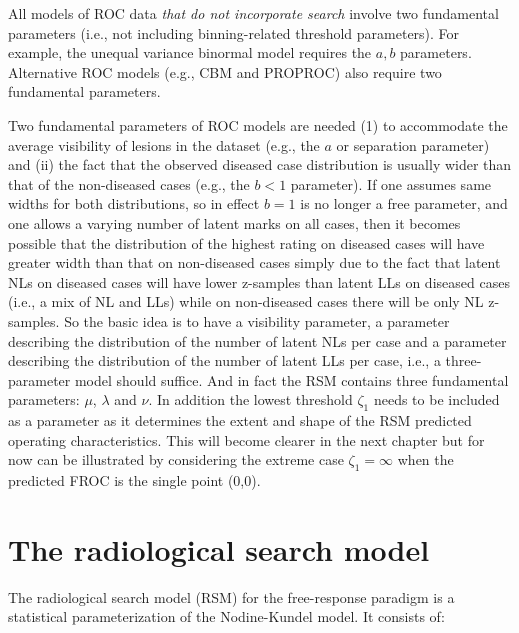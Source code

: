 \documentclass[
]{book}
\begin{document}
All models of ROC data \emph{that do not incorporate search} involve two fundamental parameters (i.e., not including binning-related threshold parameters). For example, the unequal variance binormal model requires the \(a,b\) parameters. Alternative ROC models (e.g., CBM and PROPROC) also require two fundamental parameters.

Two fundamental parameters of ROC models are needed (1) to accommodate the average visibility of lesions in the dataset (e.g., the \(a\) or separation parameter) and (ii) the fact that the observed diseased case distribution is usually wider than that of the non-diseased cases (e.g., the \(b <1\) parameter). If one assumes same widths for both distributions, so in effect \(b=1\) is no longer a free parameter, and one allows a varying number of latent marks on all cases, then it becomes possible that the distribution of the highest rating on diseased cases will have greater width than that on non-diseased cases simply due to the fact that latent NLs on diseased cases will have lower z-samples than latent LLs on diseased cases (i.e., a mix of NL and LLs) while on non-diseased cases there will be only NL z-samples. So the basic idea is to have a visibility parameter, a parameter describing the distribution of the number of latent NLs per case and a parameter describing the distribution of the number of latent LLs per case, i.e., a three-parameter model should suffice. And in fact the RSM contains three fundamental parameters: \(\mu\), \(\lambda\) and \(\nu\). In addition the lowest threshold \(\zeta_1\) needs to be included as a parameter as it determines the extent and shape of the RSM predicted operating characteristics. This will become clearer in the next chapter but for now can be illustrated by considering the extreme case \(\zeta_1 = \infty\) when the predicted FROC is the single point (0,0).

\hypertarget{rsm-details}{%
\section{The radiological search model}\label{rsm-details}}

The radiological search model (RSM) for the free-response paradigm is a statistical parameterization of the Nodine-Kundel model. It consists of:
\end{document}
